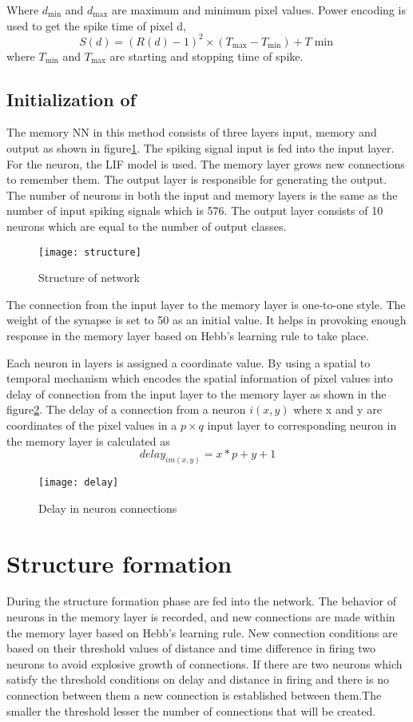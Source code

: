 Where $d_{\min}$ and $d_{\max}$ are maximum and minimum pixel values. Power
encoding is used to get the spike time of pixel d,
\begin{equation*}
    S(d)={(R(d)-1)}^2 \times (T_{\max}-T_{\min})+T{\min}
\end{equation*}
where $T_{\min}$ and $T_{\max}$ are starting and stopping time of spike.
\subsection{Initialization of \Snn}
The memory NN in this method consists of three layers input, memory and output
as shown in figure\ref{structure}. The spiking signal input is fed into the
input layer. For the neuron, the LIF model is used. The memory layer grows new
connections to remember them. The output layer is responsible for generating
the output. The number of neurons in both the input and memory layers is the
same as the number of input spiking signals which is 576. The output layer
consists of 10 neurons which are equal to the number of output classes.
\begin{figure}[h!]
    \centering
    \texttt{[image: structure]}
    \caption{Structure of network}\label{structure}
\end{figure}

The connection from the input layer to the memory layer is one-to-one style.
The weight of the synapse is set to 50 as an initial value. It helps in
provoking enough response in the memory layer based on Hebb's learning
rule\cite{hebbs} to take place.

Each neuron in layers is assigned a coordinate value. By using a spatial to
temporal mechanism which encodes the spatial information of pixel values into
delay of connection from the input layer to the memory layer as shown in the
figure\ref{delay}. The delay of a connection from a neuron $i(x,y)$ where x and
y are coordinates of the pixel values in a $p \times q$ input layer to
corresponding neuron in the memory layer is calculated as
\begin{equation*}
    delay_{im(x,y)}=x*p+y+1
\end{equation*}
\begin{figure}[h!]
    \centering
    \texttt{[image: delay]}
    \caption{Delay in neuron connections}\label{delay}
\end{figure}
\section{Structure formation}
During the structure formation phase are fed into the network. The behavior of
neurons in the memory layer is recorded, and new connections are made within
the memory layer based on Hebb's learning rule\cite{hebbs}. New connection
conditions are based on their threshold values of distance and time difference
in firing two neurons to avoid explosive growth of connections. If there are
two neurons which satisfy the threshold conditions on delay and distance in
firing and there is no connection between them a new connection is established
between them.The smaller the threshold lesser the number of connections that
will be created.

